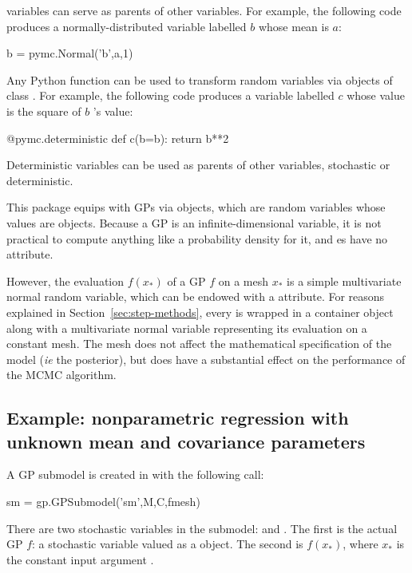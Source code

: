\documentclass[article]{jss}
\begin{document}
 variables can serve as parents of other variables. For example, the following code produces a normally-distributed variable labelled $b$ whose mean is $a$:
\begin{CodeChunk}
\begin{CodeInput}
b = pymc.Normal('b',a,1)    
\end{CodeInput}
\end{CodeChunk}

Any Python function can be used to transform random variables via objects of class . For example, the following code produces a variable labelled $c$ whose value is the square of $b$ 's value:
\begin{CodeChunk}
\begin{CodeInput}
@pymc.deterministic
def c(b=b):
    return b**2
\end{CodeInput}
\end{CodeChunk}
Deterministic variables can be used as parents of other variables, stochastic or deterministic. 

This package equips  with GPs via  objects, which are random variables whose values are  objects. Because a GP is an infinite-dimensional variable, it is not practical to compute anything like a probability density for it, and es have no  attribute.

However, the evaluation $f(x_*)$ of a GP $f$ on a mesh $x_*$ is a simple multivariate normal random variable, which can be endowed with a  attribute. For reasons explained in Section~\ref{sec:step-methods}, every  is wrapped in a  container object along with a multivariate normal variable representing its evaluation on a constant mesh. The mesh does not affect the mathematical specification of the model (\emph{ie} the posterior), but does have a substantial effect on the performance of the MCMC algorithm.  

\subsection{Example: nonparametric regression with unknown mean and covariance parameters}\label{sub:BasicMCMC}

A GP submodel is created in  with the following call:
\begin{CodeChunk}
\begin{CodeInput}
sm = gp.GPSubmodel('sm',M,C,fmesh)
\end{CodeInput}
\end{CodeChunk}
There are two stochastic variables in the submodel:  and . The first is the actual GP $f$: a stochastic variable valued as a  object. The second is $f(x_*)$, where $x_*$ is the constant input argument .
\end{document}
